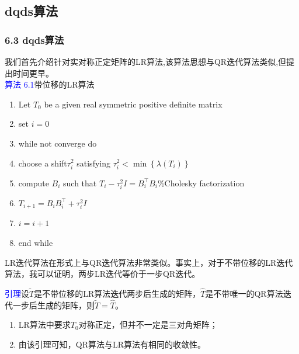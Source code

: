 \documentclass[notheorems,serif]{beamer}
\begin{document}
\subsection*{dqds算法}
\begin{frame}
\frametitle{6.3 \qquad dqds算法}


我们首先介绍针对实对称正定矩阵的LR算法,该算法思想与QR迭代算法类似,但提出时间更早。\\
\textcolor{blue}{算法 6.1}\quad 带位移的LR算法
\begin{enumerate}[1:]
	\item Let $T_0$ be a given real symmetric positive definite matrix
	\item set $i=0$
	\item while not converge do 
	\item \quad choose a shift$\tau_{i}^{2}$ satisfying $\tau_{i}^{2}<\min \left\{\lambda\left(T_{i}\right)\right\}$
	\item \quad compute $B_i$ such that $T_{i}-\tau_{i}^{2} I=B_{i}^{\top} B_{i}$\qquad \%Cholesky factorization
	\item \quad $T_{i+1}=B_{i} B_{i}^{\top}+\tau_{i}^{2} I$
	\item \quad $i=i+1$
	\item end while
\end{enumerate}
\end{frame}
\begin{frame}

LR迭代算法在形式上与QR迭代算法非常类似。事实上，对于不带位移的LR迭代算法，我可以证明，两步LR迭代等价于一步QR迭代。

\textcolor{blue}{引理}\quad 设$\tilde{T}$是不带位移的LR算法迭代两步后生成的矩阵，$\hat{T}$是不带唯一的QR算法迭代一步后生成的矩阵，则$\tilde{T}=\hat{T}$。

\begin{enumerate}[(1)]
	\item LR算法中要求$T_0$对称正定，但并不一定是三对角矩阵；
	\item 由该引理可知，QR算法与LR算法有相同的收敛性。
\end{enumerate}
\end{frame}
\end{document}
